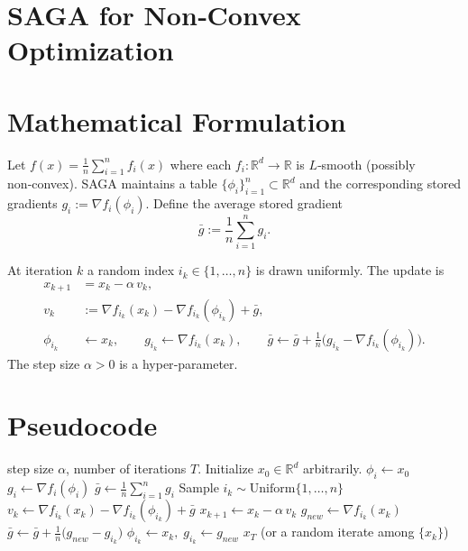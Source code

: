 \documentclass{article}
\newcommand{\R}{\mathbb{R}}
\newcommand{\grad}{\nabla}
\begin{document}
\section*{SAGA for Non‑Convex Optimization}

\section*{Mathematical Formulation}
Let $f(x)=\frac{1}{n}\sum_{i=1}^{n}f_i(x)$ where each $f_i:\R^d\to\R$ is $L$‑smooth (possibly non‑convex).  
SAGA maintains a table $\{\phi_i\}_{i=1}^n\subset\R^d$ and the corresponding stored gradients 
$g_i:=\grad f_i(\phi_i)$.  
Define the average stored gradient
\[
\bar g :=\frac{1}{n}\sum_{i=1}^{n} g_i .
\]

At iteration $k$ a random index $i_k\in\{1,\dots,n\}$ is drawn uniformly.  
The update is
\begin{align}
x_{k+1} &= x_k - \alpha \, v_k, \label{eq:update}\\
v_k &:= \grad f_{i_k}(x_k)-\grad f_{i_k}(\phi_{i_k})+\bar g , \tag{SAGA\;gradient} \label{eq:vk}\\
\phi_{i_k} &\leftarrow x_k, \qquad
g_{i_k}\leftarrow \grad f_{i_k}(x_k), \qquad 
\bar g \leftarrow \bar g +\frac{1}{n}\bigl(g_{i_k}-\grad f_{i_k}(\phi_{i_k})\bigr). \label{eq:table}
\end{align}
The step size $\alpha>0$ is a hyper‑parameter.  

\section*{Pseudocode}
\begin{algorithm}[H]
\caption{SAGA (non‑convex)}\label{alg:saga}
\begin{algorithmic}[1]
 step size $\alpha$, number of iterations $T$.
\STATE Initialize $x_0\in\R^d$ arbitrarily.
    \STATE $\phi_i \gets x_0$ 
    \STATE $g_i \gets \grad f_i(\phi_i)$
\ENDFOR
\STATE $\bar g \gets \frac{1}{n}\sum_{i=1}^{n} g_i$
    \STATE Sample $i_k\sim \text{Uniform}\{1,\dots,n\}$
    \STATE $v_k \gets \grad f_{i_k}(x_k)-\grad f_{i_k}(\phi_{i_k})+\bar g$
    \STATE $x_{k+1} \gets x_k - \alpha\, v_k$
    \STATE $g_{new}\gets \grad f_{i_k}(x_k)$
    \STATE $\bar g \gets \bar g + \frac{1}{n}\bigl(g_{new}-g_{i_k}\bigr)$
    \STATE $\phi_{i_k}\gets x_k,\; g_{i_k}\gets g_{new}$
\ENDFOR
{} $x_T$ (or a random iterate among $\{x_k\}$)
\end{algorithmic}
\end{algorithm}
\end{document}
